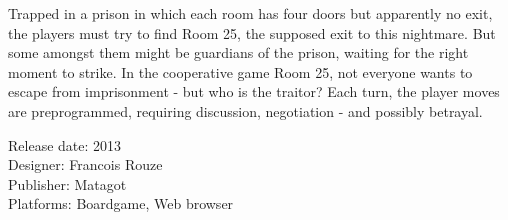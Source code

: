 Trapped in a prison in which each room has four doors but apparently no exit, the players must try to find Room 25, the supposed exit to this nightmare. But some amongst them might be guardians of the prison, waiting for the right moment to strike. In the cooperative game Room 25, not everyone wants to escape from imprisonment - but who is the traitor? Each turn, the player moves are preprogrammed, requiring discussion, negotiation - and possibly betrayal.


Release date: 2013 \\
Designer: Francois Rouze \\
Publisher: Matagot \\
Platforms: Boardgame, Web browser \\

\clearpage
